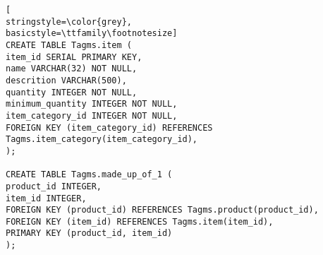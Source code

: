 \begin{lstlisting}[
stringstyle=\color{grey},
basicstyle=\ttfamily\footnotesize]
CREATE TABLE Tagms.item (
item_id SERIAL PRIMARY KEY,
name VARCHAR(32) NOT NULL,
descrition VARCHAR(500),
quantity INTEGER NOT NULL,
minimum_quantity INTEGER NOT NULL,
item_category_id INTEGER NOT NULL,
FOREIGN KEY (item_category_id) REFERENCES Tagms.item_category(item_category_id),
);

CREATE TABLE Tagms.made_up_of_1 (
product_id INTEGER,
item_id INTEGER,
FOREIGN KEY (product_id) REFERENCES Tagms.product(product_id),
FOREIGN KEY (item_id) REFERENCES Tagms.item(item_id),
PRIMARY KEY (product_id, item_id)
);


\end{lstlisting}